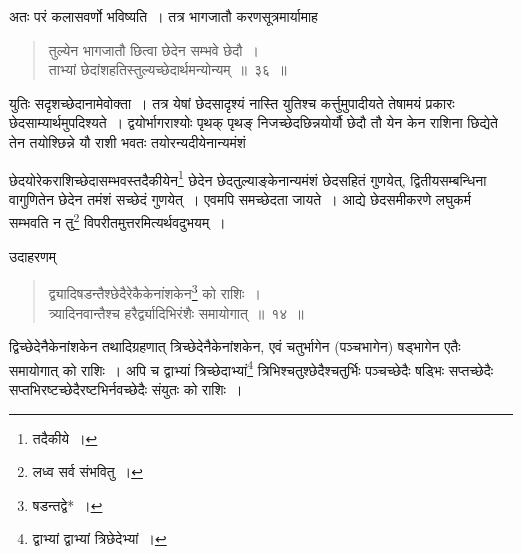 \documentclass[10pt, openany]{book}
\begin{document}
{अतः परं कलासवर्णो भविष्यति~। तत्र भागजातौ करणसूत्रमार्यामाह\textemdash}

 \label{36}
\begin{quote}
{\bs तुल्येन भागजातौ छित्वा छेदेन सम्भवे छेदौ~। \\
ताभ्यां छेदांशहतिस्तुल्यच्छेदार्थमन्योन्यम्~॥~३६~॥} \end{quote}

{युतिः सदृशच्छेदानामेवोक्ता~। तत्र येषां छेदसादृश्यं नास्ति युतिश्च
कर्त्तुमुपादीयते}
{तेषामयं प्रकारः छेदसाम्यार्थमुपदिश्यते~। द्वयोर्भागराश्योः पृथक् पृथङ्
निजच्छेदछिन्नयोर्यौ}
{छेदौ तौ येन केन राशिना छिद्येते तेन तयोश्छिन्ने यौ राशी भवतः
तयोरन्यदीयेनान्यमंशं}


\newpage

{छेदयोरेकराशिच्छेदासम्भवस्तदैकीयेन\renewcommand{\thefootnote}{\s १}\footnote{\s *तदैकीये~।} छेदेन छेदतुल्याङ्केनान्यमंशं
छेदसहितं गुणयेत्,}
{द्वितीयसम्बन्धिना वागुणितेन छेदेन तमंशं सच्छेदं गुणयेत्~। एवमपि
समच्छेदता जायते~।}
{आद्ये छेदसमीकरणे लघुकर्म सम्भवति न तु\renewcommand{\thefootnote}{\s २}\footnote{\s लध्व सर्व संभवितु~।} विपरीतमुत्तरमित्यर्थवदुभयम्~।}
\vspace{2mm}

{उदाहरणम्\textemdash}

\begin{quote}
    
{\eg  द्व्यादिषडन्तैश्छेदैरेकैकेनांशकेन\renewcommand{\thefootnote}{\s ३}\footnote{\s *षडन्तद्वे*~।} को राशिः~। \\
 त्र्यादिनवान्तैश्च हरैर्द्व्यादिभिरंशैः समायोगात्~॥~१४~॥}\end{quote}

{द्विच्छेदेनैकेनांशकेन तथादिग्रहणात् त्रिच्छेदेनैकेनांशकेन, एवं
चतुर्भागेन (पञ्चभागेन) षड्भागेन एतैः समायोगात् को राशिः~। अपि च द्वाभ्यां त्रिच्छेदाभ्यां\renewcommand{\thefootnote}{\s ४}\footnote{\s द्वाभ्यां द्वाभ्यां त्रिछेदेभ्यां~।} त्रिभिश्चतुश्छेदैश्चतुर्भिः पञ्चच्छेदैः षड्भिः सप्तच्छेदैः सप्तभिरष्टच्छेदैरष्टभिर्नवच्छेदैः संयुतः को राशिः~।}
\vspace{3mm}
\end{document}
